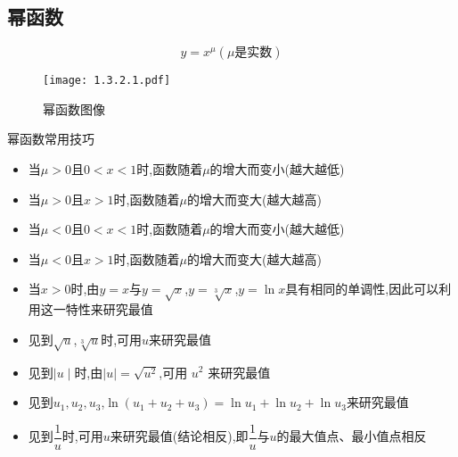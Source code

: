 \documentclass[8pt a4paper, oneside, UTF8]{ctexbook}  %
\begin{document}
\begin{sloppypar}
    \subsection{幂函数}
    $$
        y=x^{\mu}(\mu \text{是实数})
    $$
    \begin{figure}[H]
        \centering
        \texttt{[image: 1.3.2.1.pdf]}
        \caption{幂函数图像}
    \end{figure}
    \begin{criterion}{幂函数常用技巧}{}
        \begin{itemize}
            \item 当$\mu>0$且$0<x<1$时,函数随着$\mu$的增大而变小(越大越低)
            \item 当$\mu >0$且$x>1$时,函数随着$\mu$的增大而变大(越大越高)
            \item 当$\mu <0$且$0<x<1$时,函数随着$\mu$的增大而变小(越大越低)
            \item 当$\mu <0$且$x>1$时,函数随着$\mu$的增大而变大(越大越高)
            \item 当$x>0$时,由$y=x$与$y=\sqrt{x}$,$y=\sqrt[3]{x}$,$y=\ln x$具有相同的单调性,因此可以利用这一特性来研究最值
            \item 见到$\sqrt{u}$,$\sqrt[3]{u}$时,可用$u$来研究最值
            \item 见到$\mid u\mid$时,由$\mid u\mid=\sqrt{u^2}$,可用 $u^2$ 来研究最值
            \item 见到$u_1,u_2,u_3$,$\ln (u_1+u_2+u_3)=\ln u_{1}+\ln u_{2}+\ln u_{3}$来研究最值
            \item 见到$\dfrac{1}{u}$时,可用$u$来研究最值(结论相反),即$\dfrac{1}{u}$与$u$的最大值点、最小值点相反
        \end{itemize}
    \end{criterion}

\end{sloppypar}
\end{document}
